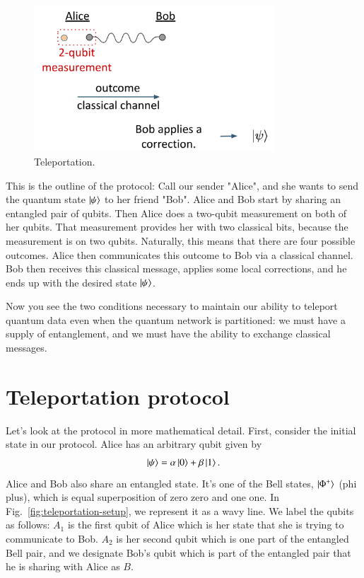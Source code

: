 \begin{figure}[H]
    \centering
    \includegraphics[width=0.8\textwidth]{lesson8/teleportation.png}
        \caption{Teleportation.}
    \label{fig:teleportation}
\end{figure}

This is the outline of the protocol: Call our sender "Alice", and she wants to send the quantum state $\left| \psi \right\rangle$ to her friend "Bob".  Alice and Bob start by sharing an entangled pair of qubits. Then Alice does a two-qubit measurement on both of her qubits. That measurement provides her with two classical bits, because the measurement is on two qubits.  Naturally, this means that there are four possible outcomes. Alice then communicates this outcome to Bob via a classical channel.  Bob then receives this classical message, applies some local corrections, and he ends up with the desired state $\left| \psi \right\rangle$. 

Now you see the two conditions necessary to maintain our ability to teleport quantum data even when the quantum network is partitioned: we must have a supply of entanglement, and we must have the ability to exchange classical messages.

\section{Teleportation protocol}
\label{sec:8-2_teleportation_protocol}


Let's look at the protocol in more mathematical detail.  First, consider the initial state in our protocol. Alice has an arbitrary qubit given by
\begin{align}
    \left| \psi \right\rangle = \alpha\left| 0 \right\rangle + \beta\left| 1 \right\rangle.
\end{align}
Alice and Bob also share an entangled state. It's one of the Bell states, $\left| \Phi^+ \right\rangle$ (phi plus), which is equal superposition of zero zero and one one. In Fig.~\ref{fig:teleportation-setup}, we represent it as a wavy line. We label the qubits as follows: $A_1$ is the first qubit of Alice which is her state that she is trying to communicate to Bob. $A_2$ is her second qubit which is one part of the entangled Bell pair, and we designate Bob's qubit which is part of the entangled pair that he is sharing with Alice as $B$.

